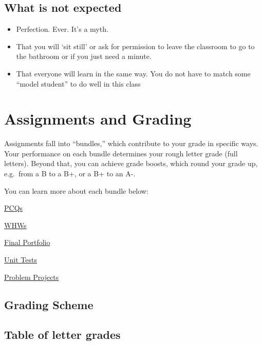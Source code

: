 \documentclass[
  letterpaper,
  DIV=11,
  numbers=noendperiod]{scrartcl}
\providecommand{\tightlist}{%
  \setlength{\itemsep}{0pt}\setlength{\parskip}{0pt}}\usepackage{longtable,booktabs,array}
\begin{document}
\subsection{What is not expected}

\begin{itemize}
\tightlist
\item
  Perfection. Ever. It's a myth.
\item
  That you will `sit still' or ask for permission to leave the classroom
  to go to the bathroom or if you just need a minute.
\item
  That everyone will learn in the same way. You do not have to match
  some ``model student'' to do well in this class
\end{itemize}

\section{Assignments and Grading}\label{assignments}

Assignments fall into ``bundles,'' which contribute to your grade in
specific ways. Your performance on each bundle determines your rough
letter grade (full letters). Beyond that, you can achieve grade boosts,
which round your grade up, e.g.~from a B to a B+, or a B+ to an A-.

You can learn more about each bundle below:

\hyperref[pcqs]{PCQs}

\hyperref[whws]{WHWs}

\hyperref[portfolio]{Final Portfolio}

\hyperref[tests]{Unit Tests}

\hyperref[problemproject]{Problem Projects}

\subsection{Grading Scheme}\label{gradingscheme}

\subsection{Table of letter grades}\label{table-of-letter-grades}
\end{document}
